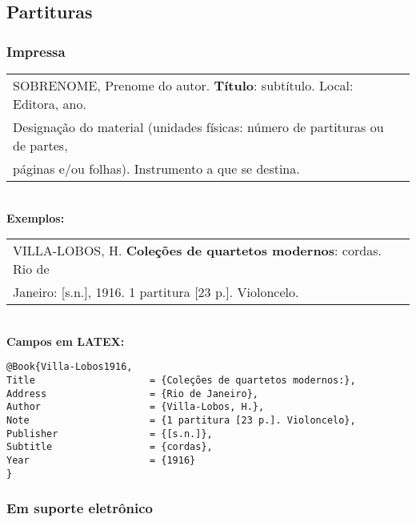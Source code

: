 \subsection{Partituras}
	
\subsubsection{Impressa}
	
	
\begin{tabular}{|l|c|} \hline
	SOBRENOME, Prenome do autor. \textbf{Título}: subtítulo. Local: Editora, ano.  \\
	Designação do material (unidades físicas: número de partituras ou de partes, \\
	páginas e/ou folhas). Instrumento a que se destina.                             
	                                                                                 \\\hline
\end{tabular} \\
	
\textbf{Exemplos:} \\
	
\begin{tabular}{|l|c|} \hline
	VILLA-LOBOS, H. \textbf{Coleções de quartetos modernos}: cordas. Rio de \\Janeiro: [s.n.], 1916. 1 partitura [23 p.]. Violoncelo. 
	                                                                          \\\hline
\end{tabular} \\
	
\textbf{Campos em LATEX:} 
	
\begingroup
\fontsize{10pt}{12pt}\selectfont
\begin{verbatim}
@Book{Villa-Lobos1916,
Title                    = {Coleções de quartetos modernos:},
Address                  = {Rio de Janeiro},
Author                   = {Villa-Lobos, H.},
Note                     = {1 partitura [23 p.]. Violoncelo},
Publisher                = {[s.n.]},
Subtitle                 = {cordas},
Year                     = {1916}
}
\end{verbatim}
\endgroup
	
\subsubsection{Em suporte eletrônico}
	
